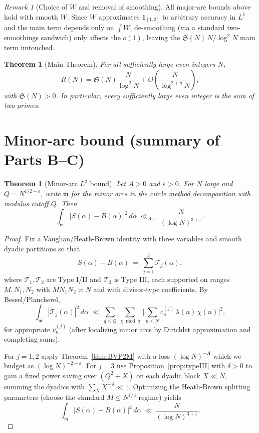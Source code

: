 \documentclass[11pt]{article}
\newtheorem{theorem}[lemma]{Theorem}
\theoremstyle{definition}
\theoremstyle{remark}
\newtheorem{remark}[lemma]{Remark}
\numberwithin{equation}{part}
\begin{document}
\begin{remark}[Choice of $W$ and removal of smoothing]
	All major-arc bounds above hold with smooth $W$.
	Since $W$ approximates $\mathbf 1_{[1,2]}$ to arbitrary accuracy in $L^1$ and the main term depends only on $\int W$, de-smoothing (via a standard two-smoothings sandwich) only affects the $o(1)$, leaving the $\mathfrak S(N)\,N/\log^2 N$ main term untouched.
\end{remark}

\begin{theorem}[Main Theorem]
	For all sufficiently large even integers $N$,
	\[
		R(N)=\mathfrak S(N)\frac{N}{\log^2 N}
		+ O\!\left(\frac{N}{\log^{2+\eta}N}\right),
	\]
	with $\mathfrak S(N)>0$.
	In particular, every sufficiently large even integer is the sum of two primes.
\end{theorem}


\section{Minor-arc bound (summary of Parts B--C)}

\begin{theorem}[Minor-arc $L^2$ bound]\label{thm:minor-L2}
	Let $A>0$ and $\varepsilon>0$. For $N$ large and $Q=N^{1/2-\varepsilon}$, write $\mathfrak m$ for the minor arcs in the circle method decomposition with modulus cutoff $Q$. Then
	\begin{equation}\label{eq:minor-L2}
		\int_{\mathfrak m} \big|S(\alpha)-B(\alpha)\big|^2\,d\alpha \ \ll_{A,\varepsilon}\ \frac{N}{(\log N)^{3+\varepsilon}}.
	\end{equation}
\end{theorem}

\begin{proof}
	Fix a Vaughan/Heath-Brown identity with three variables and smooth dyadic partitions so that
	\[
		S(\alpha)-B(\alpha)\ =\ \sum_{j=1}^3 \mathcal T_j(\alpha),
	\]
	where $\mathcal T_1,\mathcal T_2$ are Type I/II and $\mathcal T_3$ is Type III, each supported on ranges $M,N_1,N_2$ with $MN_1N_2\asymp N$ and with divisor-type coefficients. By Bessel/Plancherel,
	\[
		\int_{\mathfrak m} |\mathcal T_j(\alpha)|^2\,d\alpha \ \ll\ \sum_{q\le Q}\ \sum_{\chi\bmod q}\ \Big|\sum_{n\le N} c^{(j)}_n\,\lambda(n)\,\chi(n)\Big|^2,
	\]
	for appropriate $c^{(j)}_n$ (after localizing minor arcs by Dirichlet approximation and completing sums).

	For $j=1,2$ apply Theorem~\ref{thm:BVP2M} with a loss $(\log N)^{-A}$ which we budget as $(\log N)^{-2-\varepsilon}$. For $j=3$ use Proposition~\ref{prop:typeIII} with $\delta>0$ to gain a fixed power saving over $(Q^2+X)$ on each dyadic block $X\ll N$, summing the dyadics with $\sum_X X^{-\,\delta}\ll 1$. Optimizing the Heath-Brown splitting parameters (choose the standard $M\le N^{1/3}$ regime) yields
	\[
		\int_{\mathfrak m} \big|S(\alpha)-B(\alpha)\big|^2\,d\alpha \ \ll\ \frac{N}{(\log N)^{3+\varepsilon}}.
	\]
\end{proof}
\end{document}
